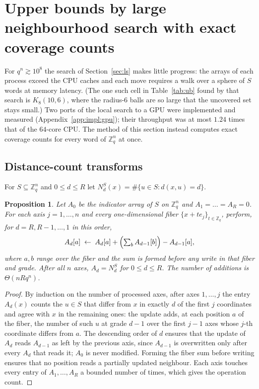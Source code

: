 \documentclass[11pt]{amsart}
\newtheorem{proposition}[theorem]{Proposition}
\newcommand{\Kq}[3]{K_{#1}(#2,#3)}
\newcommand{\Zq}{\mathbb{Z}_q}
\begin{document}
\section{Upper bounds by large neighbourhood search with exact coverage
counts}\label{sec:lns}

For $q^n\gtrsim 10^8$ the search of Section~\ref{sec:ls} makes little
progress: the arrays of each process exceed the CPU caches and each move
requires a walk over a sphere of $S$ words at memory latency. (The one
such cell in Table~\ref{tab:ub} found by that search is $\Kq{8}{10}{6}$,
where the radius-$6$ balls are so large that the uncovered set stays
small.) Two ports of the local search to a GPU were implemented and
measured (Appendix~\ref{app:impl:gpu}); their throughput was at most
$1.24$ times that of the $64$-core CPU. The method of this section instead
computes exact coverage counts for every word of $\Zq^n$ at once.

\subsection{Distance-count transforms}

For $S\subseteq\Zq^n$ and $0\le d\le R$ let
$N_d^S(x)=\#\{u\in S: d(x,u)=d\}$.

\begin{proposition}\label{prop:dct}
Let $A_0$ be the indicator array of $S$ on $\Zq^n$ and $A_1=\dots=A_R=0$.
For each axis $j=1,\dots,n$ and every one-dimensional fiber
$\{x+t e_j\}_{t\in\mathbb{Z}_q}$, perform, for $d=R,R-1,\dots,1$ in this
order,
\[
A_d[a] \;\leftarrow\; A_d[a] + \Bigl(\textstyle\sum_b A_{d-1}[b]\Bigr) -
A_{d-1}[a],
\]
where $a,b$ range over the fiber and the sum is formed before any write in
that fiber and grade. After all $n$ axes, $A_d = N_d^S$ for $0\le d\le R$.
The number of additions is $\Theta(nRq^n)$.
\end{proposition}

\begin{proof}
By induction on the number of processed axes, after axes $1,\dots,j$ the
entry $A_d(x)$ counts the $u\in S$ that differ from $x$ in exactly $d$ of
the first $j$ coordinates and agree with $x$ in the remaining ones: the
update adds, at each position $a$ of the fiber, the number of such $u$ at
grade $d-1$ over the first $j-1$ axes whose $j$-th coordinate differs from
$a$. The descending order of $d$ ensures that the update of $A_d$ reads
$A_{d-1}$ as left by the previous axis, since $A_{d-1}$ is overwritten only
after every $A_d$ that reads it; $A_0$ is never modified. Forming the
fiber sum before writing ensures that no position reads a partially
updated neighbour. Each axis touches every entry of $A_1,\dots,A_R$ a
bounded number of times, which gives the operation count.
\end{proof}
\end{document}
